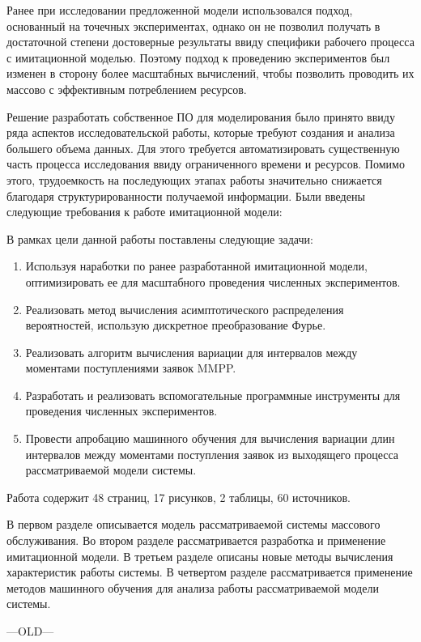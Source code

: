 Ранее при исследовании предложенной модели использовался подход, основанный на точечных экспериментах, однако он не позволил получать в достаточной степени достоверные результаты ввиду специфики рабочего процесса с имитационной моделью. Поэтому подход к проведению экспериментов был изменен в сторону более масштабных вычислений, чтобы позволить проводить их массово с эффективным потреблением ресурсов.

Решение разработать собственное ПО для моделирования было принято ввиду ряда аспектов исследовательской работы, которые требуют создания и анализа большего объема данных. Для этого требуется автоматизировать существенную часть процесса исследования ввиду ограниченного времени и ресурсов. Помимо этого, трудоемкость на последующих этапах работы значительно снижается благодаря структурированности получаемой информации.
Были введены следующие требования к работе имитационной модели:



В рамках цели данной работы поставлены следующие задачи:
\begin{enumerate}
	\item Используя наработки по ранее разработанной имитационной модели, оптимизировать ее для масштабного проведения численных экспериментов.
	\item Реализовать метод вычисления асимптотического распределения вероятностей, использую дискретное преобразование Фурье. 
	\item Реализовать алгоритм вычисления вариации для интервалов между моментами поступлениями заявок MMPP.
	\item Разработать и реализовать вспомогательные программные инструменты для проведения численных экспериментов.
	\item Провести апробацию машинного обучения для вычисления вариации длин интервалов между моментами поступления заявок из выходящего процесса рассматриваемой модели системы.
\end{enumerate}

Работа содержит 48 страниц, 17 рисунков, 2 таблицы, 60 источников.

В первом разделе описывается модель рассматриваемой системы массового обслуживания. Во втором разделе рассматривается разработка и применение имитационной модели. В третьем разделе описаны новые методы вычисления характеристик работы системы. В четвертом разделе рассматривается применение методов машинного обучения для анализа работы рассматриваемой модели системы.

---OLD---
 \clearpage
 